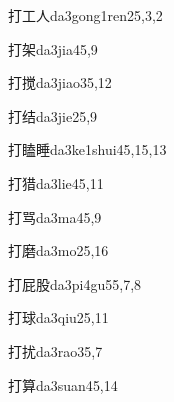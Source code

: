 \begin{verbete}{打工人}{da3gong1ren2}{5,3,2}
\end{verbete}

\begin{verbete}{打架}{da3jia4}{5,9}
\end{verbete}

\begin{verbete}{打搅}{da3jiao3}{5,12}
\end{verbete}

\begin{verbete}{打结}{da3jie2}{5,9}
\end{verbete}

\begin{verbete}{打瞌睡}{da3ke1shui4}{5,15,13}
\end{verbete}

\begin{verbete}{打猎}{da3lie4}{5,11}
\end{verbete}

\begin{verbete}{打骂}{da3ma4}{5,9}
\end{verbete}

\begin{verbete}{打磨}{da3mo2}{5,16}
\end{verbete}

\begin{verbete}{打屁股}{da3pi4gu5}{5,7,8}
\end{verbete}

\begin{verbete}{打球}{da3qiu2}{5,11}
\end{verbete}

\begin{verbete}{打扰}{da3rao3}{5,7}
\end{verbete}

\begin{verbete}{打算}{da3suan4}{5,14}
\end{verbete}

